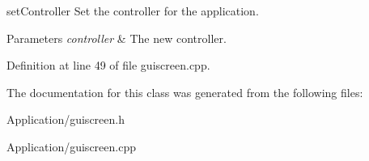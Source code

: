 set\+Controller Set the controller for the application. 


\begin{DoxyParams}{Parameters}
{\em controller} & The new controller. \\
\hline
\end{DoxyParams}


Definition at line 49 of file guiscreen.\+cpp.



The documentation for this class was generated from the following files\+:\begin{DoxyCompactItemize}
\item 
Application/guiscreen.\+h\item 
Application/guiscreen.\+cpp\end{DoxyCompactItemize}
